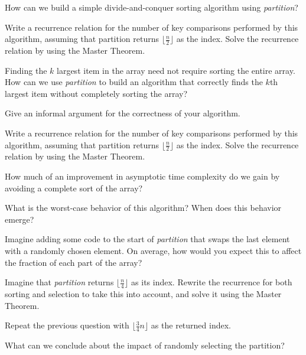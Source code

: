 \documentclass{tufte-handout}
\begin{document}
\begin{questions}
How can we build a simple divide-and-conquer sorting algorithm using \emph{partition}? 

\item Write a recurrence relation for the number of key comparisons performed by this algorithm, assuming that partition returns $\lfloor \frac{n}{2} \rfloor$ as the index. Solve the recurrence relation by using the Master Theorem. 

\item Finding the $k$ largest item in the array need not require sorting the entire array. How can we use \emph{partition} to build an algorithm that correctly finds the $k$th largest item without completely sorting the array?

\item Give an informal argument for the correctness of your algorithm.

\item Write a recurrence relation for the number of key comparisons performed by this algorithm, assuming that partition returns $\lfloor \frac{n}{2} \rfloor$ as the index. Solve the recurrence relation by using the Master Theorem.

\item How much of an improvement in asymptotic time complexity do we gain by avoiding a complete sort of the array?

\item What is the worst-case behavior of this algorithm? When does this behavior emerge?

\item Imagine adding some code to the start of \emph{partition} that swaps the last element with a randomly chosen element. On average, how would you expect this to affect the fraction of each part of the array?

\item Imagine that \emph{partition} returns $\lfloor \frac{n}{4} \rfloor$ as its index. Rewrite the recurrence for both sorting and selection to take this into account, and solve it using the Master Theorem.

\item Repeat the previous question with $\lfloor \frac{3}{4} n \rfloor$ as the returned index. 

\item What can we conclude about the impact of randomly selecting the partition?


\end{questions}
\end{document}
